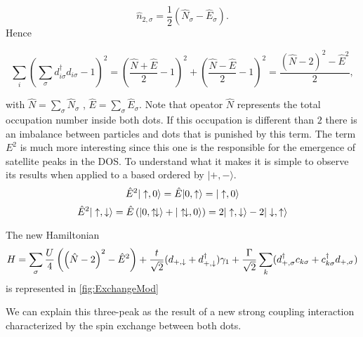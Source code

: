 \[\hat{n}_{2,\sigma}= \frac{1}{2} \left( \hat{N}_\sigma - \hat{E}_\sigma \right).  \]
Hence 

\[\sum_{i} (\sum_{\sigma} d_{i \sigma}^{\dagger}d_{i \sigma}-1)^{2} = \left(\frac{\hat{N} +\hat{E}}{2}-1 \right) ^{2} + \left( \frac{\hat{N} -\hat{E}}{2}-1 \right)^{2} = \frac{\left( \hat{N}-2 \right)^2- \hat{E}^2}{2}, \]

with $\hat{N}=\sum_\sigma \hat{N}_\sigma $ , $\hat{E}=\sum_\sigma \hat{E}_\sigma $. Note that opeator $\hat{N}$ represents the total occupation number inside both dots. If this occupation is different than $2$ there is an imbalance between particles and dots that is punished by this term. The term $E^2$ is much more interesting since this one is the responsible for the emergence of satellite peaks in the DOS. To understand what it makes it is simple to observe its results when applied to a based ordered by $\vert + , - \rangle$. 
\[ \hat{E}^2 \vert \uparrow , 0 \rangle =  \hat{E} \vert 0 , \uparrow \rangle = \vert \uparrow , 0 \rangle   \] 
\[ \hat{E}^2 \vert \uparrow , \downarrow \rangle =  \hat{E} \left( \vert 0 , \uparrow\!\downarrow \rangle + \vert \uparrow\!\downarrow , 0 \rangle \right) = 2\vert \uparrow , \downarrow \rangle - 2\vert \downarrow , \uparrow \rangle  \]





The new Hamiltonian 
\begin{equation}
H = \sum_{\sigma}  \frac{U}{4}\left( \left( \hat{N}-2 \right)^2- \hat{E}^2 \right) + \frac{t}{\sqrt{2}} (d_{+,\downarrow}+d^\dagger_{+,\downarrow})\gamma_1 
 +  \frac{\Gamma}{\sqrt{2}}\sum_{ k}(d^\dagger_{+,\sigma}c_{k\sigma}+c^\dagger_{k\sigma}d_{+,\sigma})
\label{t+}
\end{equation}
is represented in \ref{fig:ExchangeMod}







We can explain this three-peak as the result of a new strong coupling interaction characterized by the spin exchange between both dots. 


